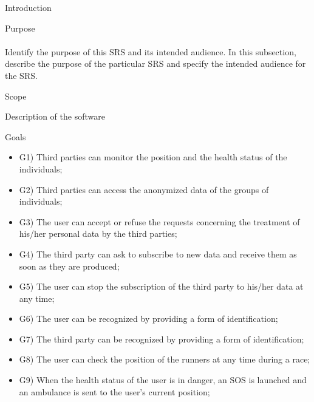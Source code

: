 \documentclass{article}
\begin{document}
\newpage
	\begin{legal}\bfseries
 	\item Introduction \\
  		\begin{legal}
    	\item Purpose\\
		\\
		{\normalfont Identify the purpose of this SRS and its intended audience. In this subsection, describe the purpose of the particular SRS and specify the intended audience for the SRS.}
		\\
		\item Scope\\
			\begin{legal}
    		\item Description of the software \\
			\item Goals \\
			{\normalfont
				\begin{itemize}
				\item G1) Third parties can monitor the position and the health status of the individuals;\\
				\item G2) Third parties can access the anonymized data of the groups of individuals;\\
				\item G3) The user can accept or refuse the requests concerning the treatment of his/her personal data by the third parties;\\
				\item G4) The third party can ask to subscribe to new data and receive them as soon as they are produced;\\
				\item G5) The user can stop the subscription of the third party to his/her data at any time;\\
				\item G6) The user can be recognized by providing a form of identification;\\
				\item G7) The third party can be recognized by providing a form of identification;\\
				\item G8) The user can check the position of the runners at any time during a race;\\
				\item G9) When the health status of the user is in danger, an SOS is launched and an ambulance is sent to the user’s current position;\\

\end{itemize}}
\end{legal}
\end{legal}
\end{legal}
\end{document}
